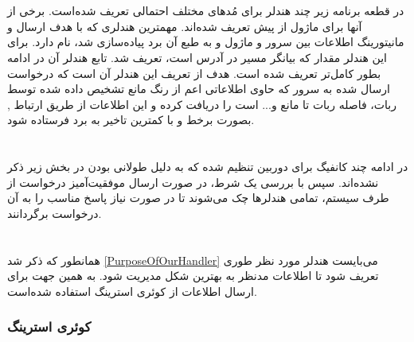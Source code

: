 \section*{}
\begin{latin}
	
\end{latin}

در قطعه برنامه زیر چند هندلر برای مُد‌های مختلف احتمالی تعریف شده‌است. برخی از آنها برای ماژول
از پیش تعریف شده‌اند. مهمترین هندلری که با هدف ارسال و مانیتورینگ اطلاعات بین سرور و ماژول و به طبع آن برد
پیاده‌سازی شد،
نام دارد. برای این هندلر مقدار
که بیانگر مسیر
\noindent\unskip{}
در آدرس است،
تعریف شد. تابع هندلر آن در ادامه بطور کامل‌تر تعریف شده است.
هدف از تعریف این هندلر
\label{PurposeOfOurHandler}
آن است که درخواست ارسال شده به سرور که حاوی اطلاعاتی اعم از رنگ مانع تشخیص داده شده توسط ربات، فاصله ربات تا مانع و... است را دریافت کرده و این اطلاعات از طریق ارتباط
, بصورت برخط و با کمترین تاخیر به برد
فرستاده شود.



\section*{}
\begin{latin}
	
\end{latin}

در ادامه چند کانفیگ برای دوربین تنظیم شده که به دلیل طولانی بودن در بخش زیر ذکر نشده‌اند. سپس با بررسی یک شرط، در صورت ارسال موفقیت‌آمیز درخواست از طرف سیستم، تمامی هندلر‌ها چک می‌شوند تا در صورت نیاز پاسخ مناسب را به آن درخواست برگردانند.

\section*{}
\begin{latin}
	
\end{latin}

همانطور که ذکر شد
\ref{PurposeOfOurHandler}
می‌بایست هندلر مورد نظر طوری تعریف شود تا اطلاعات مدنظر به بهترین شکل مدیریت شود.
به همین جهت برای ارسال اطلاعات از کوئری استرینگ
\noindent\unskip{}
استفاده شده‌است.

\subsubsection{کوئری استرینگ}

